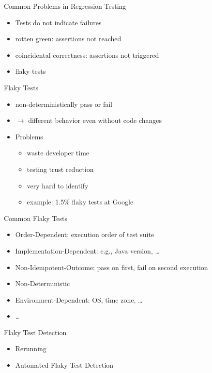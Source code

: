 \begin{frame}[fragile]{\insertsubsection}
	\begin{fancycolumns}[animation=none]
		\begin{note}{Common Problems in Regression Testing}
			\begin{itemize}
				\item Tests do not indicate failures
				\item rotten green: assertions not reached
				\item coincidental correctness: assertions not triggered
				\item flaky tests
			\end{itemize}
		\end{note}
		\begin{definition}{Flaky Tests}
			\begin{itemize}
				\item non-deterministically pass or fail
				\item $\rightarrow$ different behavior even without code changes
				\item Problems
				\begin{itemize}
					\item waste developer time
					\item testing trust reduction
					\item very hard to identify
					\item example: 1.5\% flaky tests at Google
				\end{itemize}
			\end{itemize}
		\end{definition}\pause
		\nextcolumn
		\begin{note}{Common Flaky Tests \mysource{\idoft}}
			\begin{itemize}
				\item Order-Dependent: execution order of test suite
				\item Implementation-Dependent: e.g., Java version, \dots
				\item Non-Idempotent-Outcome: pass on first, fail on second execution
				\item Non-Deterministic
				\item Environment-Dependent: OS, time zone, \dots
				\item \dots
			\end{itemize} 
		\end{note}
		\pause
		\begin{note}{Flaky Test Detection}
			\begin{itemize}
				\item Rerunning
				\item Automated Flaky Test Detection
			\end{itemize}
		\end{note}
	\end{fancycolumns}
\end{frame}


